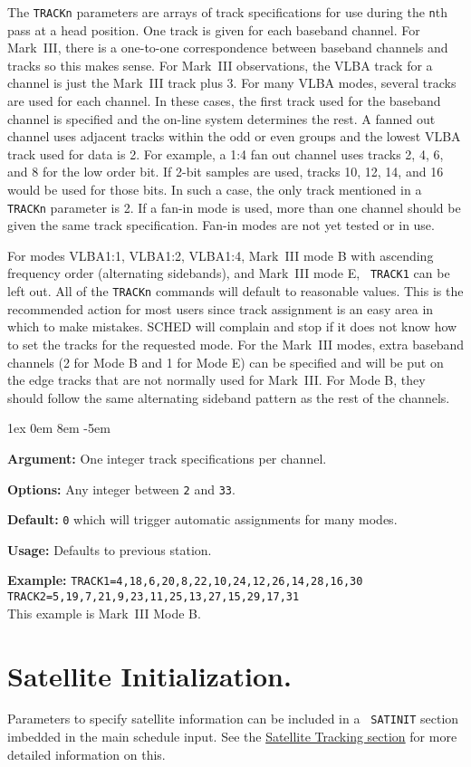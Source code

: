 \documentclass{report}
\newcommand{\rcwbox}[5]{
  \begin{list}{}{\parsep 1ex  \itemsep 0em
                 \leftmargin 8em  \itemindent -5em }
    \item {\bf Argument:} #1
    \item {\bf Options:}  #2
    \item {\bf Default:}  #3
    \item {\bf Usage:}    #4
    \item {\bf Example:}  #5
  \end{list}
}
\begin{document}
   The {\tt TRACKn} parameters are arrays of track specifications for
use during the {\tt n}th pass at a head position. One track is given
for each baseband channel. For Mark~III, there is a one-to-one
correspondence between baseband channels and tracks so this makes
sense.  For Mark~III observations, the VLBA track for a channel is
just the Mark~III track plus 3.  For many VLBA modes, several tracks
are used for each channel. In these cases, the first track used for
the baseband channel is specified and the on-line system determines
the rest. A fanned out channel uses adjacent tracks within the odd or
even groups and the lowest VLBA track used for data is 2. For example,
a 1:4 fan out channel uses tracks 2, 4, 6, and 8 for the low order
bit. If 2-bit samples are used, tracks 10, 12, 14, and 16 would be
used for those bits.  In such a case, the only track mentioned in a
{\tt TRACKn} parameter is 2.  If a fan-in mode is used, more than one
channel should be given the same track specification.  Fan-in modes
are not yet tested or in use.

For modes VLBA1:1, VLBA1:2, VLBA1:4, Mark~III mode B with ascending
frequency order (alternating sidebands), and Mark~III mode E, {\tt
TRACK1} can be left out. All of the {\tt TRACKn} commands will default
to reasonable values. This is the recommended action for most users
since track assignment is an easy area in which to make mistakes. {\sc
SCHED} will complain and stop if it does not know how to set the
tracks for the requested mode. For the Mark~III modes, extra baseband
channels (2 for Mode B and 1 for Mode E) can be specified and will be
put on the edge tracks that are not normally used for Mark~III. For
Mode B, they should follow the same alternating sideband pattern as
the rest of the channels.

\rcwbox
{One integer track specifications per channel.}
{Any integer between {\tt 2} and {\tt 33}.}
{{\tt 0} which will trigger automatic assignments for many modes.}
{Defaults to previous station.}
{{\tt TRACK1=4,18,6,20,8,22,10,24,12,26,14,28,16,30} \\
 {\tt TRACK2=5,19,7,21,9,23,11,25,13,27,15,29,17,31} \\
This example is Mark~III Mode B.}


\section{\label{SEC:SATINIT}Satellite Initialization.}

Parameters to specify satellite information can be included in a {\tt
SATINIT} section imbedded in the main schedule input.  See the
{\hyperref[SEC:SATEL]{Satellite Tracking section}} for more detailed
information on this.
\end{document}
